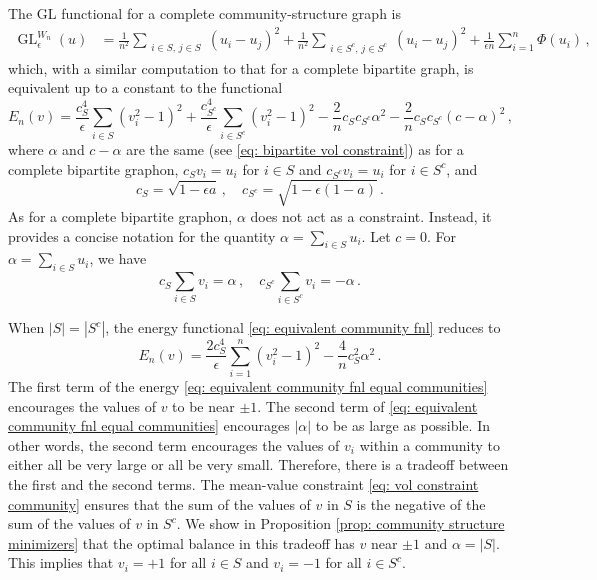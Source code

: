 \documentclass[11pt]{amsart}
\def\ep{\epsilon}
\def\GL{\operatorname{GL}}
\numberwithin{equation}{section}
\begin{document}
{The GL functional for a complete community-structure graph is 
\begin{align*}
    \GL^{W_n}_\ep(u) &= \frac{1}{n^2} \sum_{\substack{i\in S , \, j\in S}} (u_i - u_j)^2 + \frac{1}{n^2} \sum_{\substack{i\in S^c , \, j\in S^c}} (u_i - u_j)^2 
    + \frac{1}{\ep n} \sum_{i = 1}^n \Phi(u_i) \,,
\end{align*}
which, with a similar computation to that for a complete bipartite graph, is equivalent up to a constant to the functional
\begin{equation}\label{eq: equivalent community fnl}
    E_n(v) =  \frac{c_S^4}{\ep} \sum_{i\in S} (v_i^2 - 1)^2 + \frac{c_{S^c}^4}{\ep} \sum_{i\in S^c} (v_i^2 - 1)^2 - \frac{2}{n} c_S c_{S^c} \alpha^2 - \frac{2}{n}c_S c_{S^c}(c - \alpha)^2 \,,
\end{equation}
where $\alpha$ and $c - \alpha$ are the same (see \eqref{eq: bipartite vol constraint}) as for a complete bipartite graphon, $c_S v_i = u_i$ for $i\in S$ and $c_{S^c} v_i = u_i$ for $i\in S^c$, and 
\begin{equation}\label{eq: communities scaling}
    c_S = \sqrt{1 - \ep a} \,, \quad  c_{S^c} = \sqrt{1 - \ep(1 - a)} \,. 
\end{equation}
As for a complete bipartite graphon, $\alpha$ does not act as a constraint. Instead, it provides a concise notation for the quantity $\alpha = \sum_{i\in S} u_i$.} Let $c = 0$. 
For $\alpha = \sum_{i\in S} u_i$, we have 
\begin{equation}\label{eq: vol constraint community}
    c_S \sum_{i\in S} v_i = \alpha \,, \quad c_{S^c} \sum_{i\in S^c} v_i = -\alpha \,.
\end{equation}

When $|S| = |S^c|$, the energy functional \eqref{eq: equivalent community fnl} reduces to 
\begin{equation}\label{eq: equivalent community fnl equal communities}
    E_n(v) =  \frac{2c_S^4}{\ep} \sum_{i = 1}^n (v_i^2 - 1)^2 - \frac{4}{n} c_S^2 \alpha^2 \,.
\end{equation}
The {first} term of the energy \eqref{eq: equivalent community fnl equal communities} encourages the values of $v$ to be near $\pm 1$. The {second} term of \eqref{eq: equivalent community fnl equal communities} encourages {$|\alpha|$} to be as large as possible. In other words, the second term encourages the values of $v_i$ within a community to either all be very large or all be very small. Therefore, there is a tradeoff between the first and the second terms.
The {mean-value constraint} \eqref{eq: vol constraint community} ensures that the sum of the values of $v$ in $S$ is the negative of the sum of the values of $v$ in $S^c$. We show {in Proposition \ref{prop: community structure minimizers}} that the optimal balance in this tradeoff has $v$ near $\pm 1$ and $\alpha = |S|$. This implies that $v_i = +1$ for all $i \in S$ and $v_i = -1$ for all $i \in S^c$.
\end{document}
